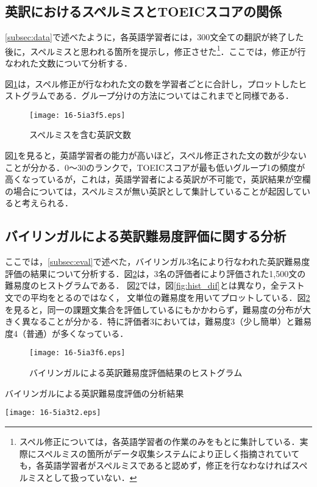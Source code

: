 \documentclass[japanese]{jnlp_1.4}
\begin{document}
\subsection{英訳におけるスペルミスとTOEICスコアの関係}
\label{subsec:misspell}

\ref{subsec:data}で述べたように，各英語学習者には，300文全ての翻訳が終了した後に，スペルミスと思われる箇所を提示し，修正させた\footnote{スペル修正については，各英語学習者の作業のみをもとに集計している．実際にスペルミスの箇所がデータ収集システムにより正しく指摘されていても，各英語学習者がスペルミスであると認めず，修正を行なわなければスペルミスとして扱っていない．}．ここでは，修正が行なわれた文数について分析する．

図\ref{fig:hist_misspell}は，スペル修正が行なわれた文の数を学習者ごとに合計し，プロットしたヒストグラムである．グループ分けの方法についてはこれまでと同様である．


\begin{figure}[b]
\begin{center}
\texttt{[image: 16-5ia3f5.eps]}
\end{center}
\caption{スペルミスを含む英訳文数}
\label{fig:hist_misspell}
\end{figure}


図\ref{fig:hist_misspell}を見ると，英語学習者の能力が高いほど，スペル修正された文の数が少ないことが分かる．0〜30のランクで，TOEICスコアが最も低いグループ1の頻度が高くなっているが，これは，英語学習者による英訳が不可能で，英訳結果が空欄の場合については，スペルミスが無い英訳として集計していることが起因していると考えられる．


\subsection{バイリンガルによる英訳難易度評価に関する分析}

ここでは，\ref{subsec:eval}で述べた，バイリンガル3名により行なわれた英訳難易度評価の結果について分析する．図\ref{fig:hist_dif_bilin}は，3名の評価者により評価された1,500文の難易度のヒストグラムである．
図\ref{fig:hist_dif_bilin}では，図\ref{fig:hist_dif}とは異なり，全テスト文での平均をとるのではなく，
文単位の難易度を用いてプロットしている．図\ref{fig:hist_dif_bilin}を見ると，同一の課題文集合を評価しているにもかかわらず，難易度の分布が大きく異なることが分かる．特に評価者3においては，難易度3（少し簡単）と難易度4（普通）が多くなっている．

\begin{figure}[b]
\begin{center}
\texttt{[image: 16-5ia3f6.eps]}
\end{center}
\caption{バイリンガルによる英訳難易度評価結果のヒストグラム}
\label{fig:hist_dif_bilin}
\end{figure}
\begin{table}[b]
\caption{バイリンガルによる英訳難易度評価の分析結果}
\begin{center}
\texttt{[image: 16-5ia3t2.eps]}
\end{center}
\label{tab:2}
\end{table}
\end{document}
